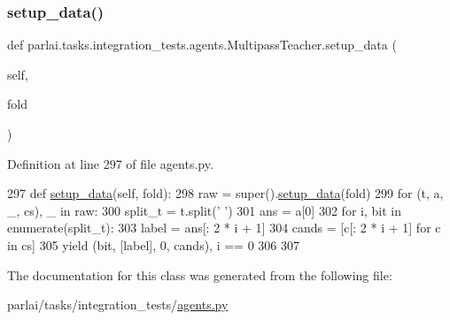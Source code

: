 \subsubsection{\texorpdfstring{setup\+\_\+data()}{setup\_data()}}
{\footnotesize\ttfamily def parlai.\+tasks.\+integration\+\_\+tests.\+agents.\+Multipass\+Teacher.\+setup\+\_\+data (\begin{DoxyParamCaption}\item[{}]{self,  }\item[{}]{fold }\end{DoxyParamCaption})}



Definition at line 297 of file agents.\+py.


\begin{DoxyCode}
297     \textcolor{keyword}{def }\hyperlink{namespaceparlai_1_1tasks_1_1multinli_1_1agents_a4fa2cb0ba1ed745336ad8bceed36b841}{setup\_data}(self, fold):
298         raw = super().\hyperlink{namespaceparlai_1_1tasks_1_1multinli_1_1agents_a4fa2cb0ba1ed745336ad8bceed36b841}{setup\_data}(fold)
299         \textcolor{keywordflow}{for} (t, a, \_, cs), \_ \textcolor{keywordflow}{in} raw:
300             split\_t = t.split(\textcolor{stringliteral}{' '})
301             ans = a[0]
302             \textcolor{keywordflow}{for} i, bit \textcolor{keywordflow}{in} enumerate(split\_t):
303                 label = ans[: 2 * i + 1]
304                 cands = [c[: 2 * i + 1] \textcolor{keywordflow}{for} c \textcolor{keywordflow}{in} cs]
305                 \textcolor{keywordflow}{yield} (bit, [label], 0, cands), i == 0
306 
307 
\end{DoxyCode}


The documentation for this class was generated from the following file\+:\begin{DoxyCompactItemize}
\item 
parlai/tasks/integration\+\_\+tests/\hyperlink{parlai_2tasks_2integration__tests_2agents_8py}{agents.\+py}\end{DoxyCompactItemize}

